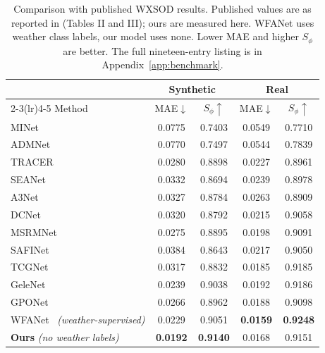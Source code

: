 \documentclass[10pt,a4paper,twocolumn,twoside]{article}
\begin{document}
\begin{table}[tbp]
\centering
\caption{Comparison with published WXSOD results. Published values are as reported in
\cite{wxsod2025} (Tables II and III); ours are measured here. WFANet uses weather class
labels, our model uses none. Lower MAE and higher $S_\phi$ are better. The full
nineteen-entry listing is in Appendix~\ref{app:benchmark}.}
\label{tab:compare}
\footnotesize
\begin{tabular}{@{}lcccc@{}}
\toprule
& \multicolumn{2}{c}{Synthetic} & \multicolumn{2}{c}{Real} \\
\cmidrule(lr){2-3}\cmidrule(lr){4-5}
Method & MAE$\downarrow$ & $S_\phi\uparrow$ & MAE$\downarrow$ & $S_\phi\uparrow$ \\
\midrule
MINet~\cite{minet}          & 0.0775 & 0.7403 & 0.0549 & 0.7710 \\
ADMNet~\cite{admnet}         & 0.0770 & 0.7497 & 0.0544 & 0.7839 \\
TRACER~\cite{tracer}         & 0.0280 & 0.8898 & 0.0227 & 0.8961 \\
SEANet~\cite{seanet}         & 0.0332 & 0.8694 & 0.0239 & 0.8978 \\
A3Net~\cite{a3net}          & 0.0327 & 0.8784 & 0.0263 & 0.8909 \\
DCNet~\cite{dcnet}          & 0.0320 & 0.8792 & 0.0215 & 0.9058 \\
MSRMNet~\cite{msrmnet}        & 0.0275 & 0.8895 & 0.0198 & 0.9091 \\
SAFINet~\cite{safinet}        & 0.0384 & 0.8643 & 0.0217 & 0.9050 \\
TCGNet~\cite{tcgnet}         & 0.0317 & 0.8832 & 0.0185 & 0.9185 \\
GeleNet~\cite{gelenet}        & 0.0239 & 0.9038 & 0.0192 & 0.9186 \\
GPONet~\cite{gponet}         & 0.0266 & 0.8962 & 0.0188 & 0.9098 \\
WFANet~\cite{wxsod2025} \textit{(weather-supervised)} & 0.0229 & 0.9051 & \textbf{0.0159} & \textbf{0.9248} \\
\midrule
\textbf{Ours} \textit{(no weather labels)} & \textbf{0.0192} & \textbf{0.9140} & 0.0168 & 0.9151 \\
\bottomrule
\end{tabular}
\end{table}
\end{document}
